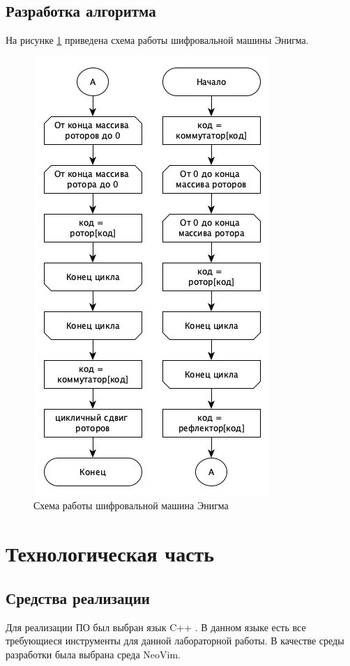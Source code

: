 \subsection{Разработка алгоритма}

На рисунке \ref{fig:alg} приведена схема работы шифровальной машины Энигма.

\begin{figure}[ht!]
	\centering
	\includegraphics[width=0.6\linewidth]{assets/graphs/enigma-algo.png}
	\caption{Схема работы шифровальной машина Энигма}
	\label{fig:alg}
\end{figure}

\clearpage

\section{Технологическая часть}

\subsection{Средства реализации}

Для реализации ПО был выбран язык C++ \cite{c++}.
В данном языке есть все требующиеся инструменты для данной лабораторной работы.
В качестве среды разработки была выбрана среда NeoVim\cite{nvim}.

